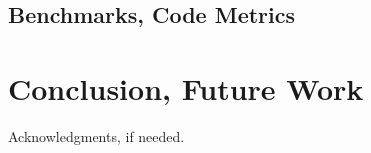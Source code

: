 \documentclass[preprint]{sigplanconf}
\begin{document}
\subsection{Benchmarks, Code Metrics}

\section{Conclusion, Future Work}
\label{discussion}

%
%
\acks

Acknowledgments, if needed.



%
%
%
\end{document}

